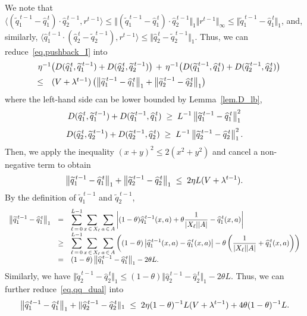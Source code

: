 \documentclass[12pt, final]{l4dc2023}
\begin{document}
We note that $\langle{ (\tilde q_1^{\,t-1} -\hat q_1^{\,t} )\cdot \hat q_2^{\,t-1}},{r^{t-1}}\rangle \leq \Vert (\tilde q_1^{\,t-1} -\hat q_1^{\,t} )\cdot \hat q_2^{\,t-1}\Vert_1\Vert{r^{t-1}}\Vert_\infty\leq \Vert\tilde q_1^{\,t-1} -\hat q_1^{\,t} \Vert_1$, and, similarly, $\langle\hat q_1^{\,t-1}\cdot (\hat q_2^{\,t} - \tilde q_2^{\,t-1} ),{r^{t-1}}\rangle\leq\Vert\hat q_2^{\,t} - \tilde q_2^{\,t-1}\Vert_1$. Thus, we can reduce~\eqref{eq.pushback_I} into
\[
\begin{array}{rcl}
&& \!\!\!\! \!\!\!\! \!\! 
\eta^{-1} \big(D(\hat q_1^{\,t},\tilde q_1^{\,t-1}) + D(\hat q_2^{\,t}, \tilde q_2^{\,t-1})\big)
\,+\,
\eta^{-1} \big(D( \tilde q_1^{\,t-1},\hat q_1^{\,t}) + D( \tilde q_2^{\,t-1}, \hat q_2^{\,t}) \big)
\\[0.2cm]
&\leq&
(V+\lambda^{t-1}) 
\rbr{
	\norm{ \tilde q_1^{\,t-1} - \hat q_1^{\,t} }_1+
	\norm{ \tilde q_2^{\,t-1} - \hat q_2^{\,t}}_1
}
\end{array}
\]
where the left-hand side can be lower bounded by Lemma~\ref{lem.D_lb}, 
\[
D(\widehat q_1^{\,t},\widetilde q_1^{\,t-1})+D( \widetilde q_1^{\,t-1},\widehat q_1^{\,t}) \;\geq\; L^{-1}\left\|{ \widetilde q_1^{\,t-1}-\widehat q_1^{\,t} }\right\|_1^2
\]
\[
D(\widehat q_2^{\,t},\widetilde q_2^{\,t-1})+D( \widetilde q_2^{\,t-1},\widehat q_2^{\,t}) \;\geq\; L^{-1}\left\|{ \widetilde q_2^{\,t-1}-\widehat q_2^{\,t} }\right\|_1^2.
\]
Then, we apply the inequality $(x+y)^2\leq2(x^2+y^2) $ and cancel a non-negative term to obtain
\begin{equation}\label{eq.qq_dual}
\left\|{ \widetilde q_1^{\,t-1}-\widehat q_1^{\,t} }\right\|_1 + \left\|{ \widetilde q_2^{\,t-1}-\widehat q_2^{\,t} }\right\|_1
\;\leq\;
2\eta  L (V+\lambda^{t-1}).
\end{equation}
By the definition of $\tilde q_1^{\,t-1}$ and $\tilde q_2^{\,t-1}$,
\[
\begin{array}{rcl}
\left\|{ \widetilde q_1^{\,t-1}-\widehat q_1^{\,t} }\right\|_1 
&=&\displaystyle
\sum_{\ell\,=\,0}^{L-1}\sum_{x\,\in\,X_\ell} \sum_{a\,\in\,A}
\left|
	(1-\theta)\widehat {q}_1^{\,t-1}(x,a)+\theta\frac{1}{|X_\ell||A|} - \widehat q_1^{\,t}(x,a)
\right|
\\[0.2cm]
&\geq&\displaystyle
\sum_{\ell\,=\,0}^{L-1}\sum_{x\,\in\,X_\ell} \sum_{a\,\in\,A}
\left(
	(1-\theta)  \left|
		\widehat {q}_1^{\,t-1}(x,a)- \widehat q_1^{\,t}(x,a)
	\right| -\theta \left(\frac{1}{|X_\ell||A|} + \widehat q_1^{\,t}(x,a)\right)
\right)
\\[0.2cm]
&=& (1-\theta) \left\|{\widehat {q}_1^{\,t-1}-\widehat q_1^{\,t}}\right\|_1 -2\theta L.
\end{array}
\]
Similarly, we have $\Vert{ \tilde q_2^{\,t-1}-\hat q_2^{\,t} }\Vert_1 \leq (1-\theta) \Vert{\hat {q}_2^{\,t-1}-\hat q_2^{\,t}}\Vert_1 -2\theta L$. Thus, we can further reduce~\eqref{eq.qq_dual} into
\begin{equation}\label{eq.case(i)}
\left\|{\widehat {q}_1^{\,t-1}-\widehat q_1^{\,t}}\right\|_1 +\Vert{\widehat{q}_2^{\,t-1}-\widehat q_2^{\,t}}\Vert_1 
\;\leq\;
2\eta (1-\theta)^{-1} L (V+\lambda^{t-1}) + 4 \theta (1-\theta)^{-1}  L.
\end{equation}
\end{document}
